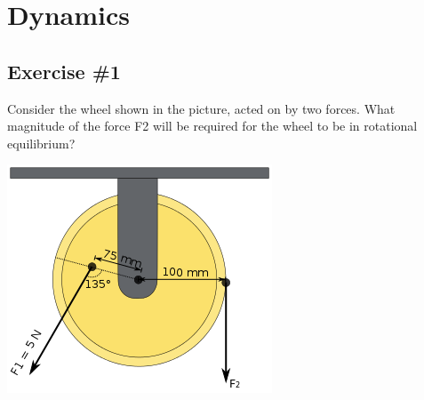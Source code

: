 \documentclass[a4paper,12pt]{article}
\begin{document}
    \section*{Dynamics}
        \subsection*{Exercise \#1}
	Consider the wheel shown in the picture, acted on by two forces. What
	magnitude of the force F2 will be required for the wheel to be in rotational
	equilibrium?

	\includegraphics{img/torque-angular-momentum-ex1.png}
\end{document}
